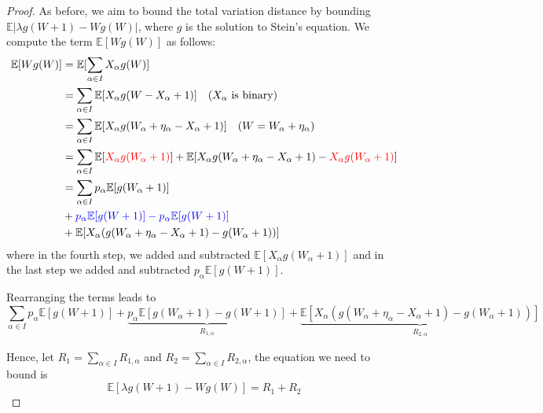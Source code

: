 \documentclass{article}
\begin{document}
\begin{proof}

    As before, we aim to bound the total variation distance by bounding $\mathbb{E}|\lambda g(W+1) - Wg(W)|$, where $g$ is the solution to Stein's equation.  
    We compute the term $\mathbb{E}[Wg(W)]$ as follows:  
    \begin{align*}
        \mathbb{E}[Wg(W)] &= \mathbb{E}[\sum_{\alpha \in I} X_\alpha g(W)]\\
        &= \sum_{\alpha \in I} \mathbb{E}[X_\alpha g(W - X_\alpha + 1)] \quad \text{($X_\alpha$ is binary)}
        \\
        &= \sum_{\alpha \in I} \mathbb{E}[X_\alpha g(W_\alpha + \eta_\alpha -X_\alpha +  1)]\quad \text{($W = W_\alpha + \eta_\alpha$)}
        \\
        &= \sum_{\alpha \in I} \mathbb{E}[\textcolor{red}{X_\alpha g(W_\alpha + 1)}] + \mathbb{E}[X_\alpha g(W_\alpha + \eta_\alpha -X_\alpha +  1) - \textcolor{red}{X_\alpha g(W_\alpha + 1)}]\\
        &= \sum_{\alpha \in I} p_\alpha \mathbb{E}[g(W_\alpha + 1)] \\
        &+ \color{blue}{p_\alpha \mathbb{E}[g(W+1)] - p_\alpha \mathbb{E}[g(W+1)]} \\
        &+ \mathbb{E}[X_\alpha (g(W_\alpha + \eta_\alpha -X_\alpha +  1) - g(W_\alpha + 1))]
    \end{align*}
where in the fourth step, we added and subtracted $\mathbb{E}[X_\alpha g(W_\alpha+1)]$ and in the last step we added and subtracted $p_\alpha \mathbb{E}[g(W+1)]$.

Rearranging the terms leads to 
    \[\sum_{\alpha \in I} p_\alpha \mathbb{E}[g(W + 1)] + \underbrace{p_\alpha \mathbb{E}[g(W_\alpha+1) - g(W+1)]}_{R_{1,\alpha}} + \underbrace{\mathbb{E}[X_\alpha (g(W_\alpha + \eta_\alpha -X_\alpha +  1) - g(W_\alpha + 1))]}_{R_{2, \alpha}}\] 

    Hence, let $R_1 = \sum_{\alpha \in I} R_{1,\alpha}$ and $R_2 = \sum_{\alpha \in I} R_{2,\alpha}$,
    the equation we need to bound is
    \begin{equation*}
        \mathbb{E}[\lambda g(W+1) - Wg(W)] =  R_1 + R_2
    \end{equation*}


\end{proof}
\end{document}
